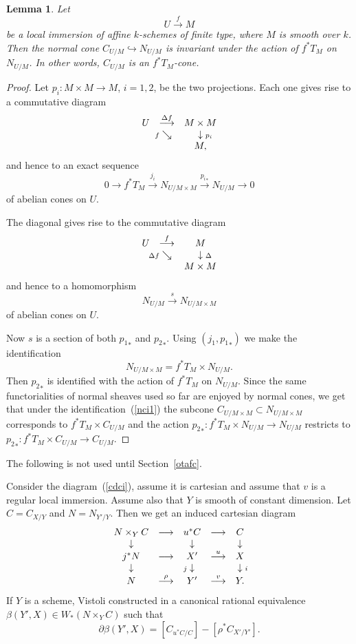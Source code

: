 \documentclass[11pt]{article}
\theoremstyle{plain}
\newtheorem{lem}[prop]{Lemma}
\theoremstyle{definition}
\newenvironment{pf}{\begin{proof}}{\end{proof}}
\newcommand{\upst}{^{\ast}}
\newcommand{\lst}{_{\ast}}
\newcommand{\del}{\partial}
\newcommand{\ldiag}[1]
       {\makebox[0cm]{\({\scriptstyle#1}\downarrow\phantom{\scriptstyle#1}\)}}
\newcommand{\rdiag}[1]
       {\makebox[0cm]{\(\phantom{\scriptstyle#1}\downarrow{\scriptstyle#1}\)}}
\newcommand{\sediag}[1]
       {\makebox[0cm]{\({\scriptstyle#1}\searrow\phantom{\scriptstyle#1}\)}}
\newcommand{\comtri}[6]{
\begin{array}{ccc}
#1 & \stackrel{#2}{\longrightarrow} & #3         \\
   & \sediag{#4}                    & \rdiag{#5} \\
   &                                & #6
\end{array}}
\newcommand{\ses}[5]
{0\longrightarrow#1\stackrel{#2}{ \longrightarrow}#3\stackrel{#4}{
\longrightarrow}#5\longrightarrow0}
\theoremstyle{plain}
\theoremstyle{definition}
\theoremstyle{remark}
\begin{document}
\begin{lem}\label{nci} %
Let
\[
U \stackrel{f}{\longrightarrow}  M
\]
be a local immersion of affine
\(k\)-schemes of finite type, where \(M\) is smooth over \(k\). Then the normal cone
\(C_{U/M}\hookrightarrow N_{U/M}\) is invariant under the action of \(f\upst T_M\)
on
\(N_{U/M}\). In other words, \(C_{U/M}\) is an \(f\upst T_M\)-cone.
\end{lem}
\begin{pf}
Let \(p_i:M\times M\rightarrow M\), \(i=1,2\), be the two projections.
Each one gives rise to a commutative diagram
\[
\comtri{U}{\Delta f}{M\times M}{f}{p_i}{M,}
\]
and hence to an exact sequence
\[
\ses{f\upst T_M}{j_i}{N_{U/M\times M}}{{p_i}\lst}{N_{U/M}}
\]
of abelian cones on \(U\).

The diagonal gives rise to the commutative diagram
\[
\comtri{U}{f}{M}{\Delta f}{\Delta}{M\times M}
\]
and hence to a homomorphism
\[
N_{U/M}\stackrel{s}{\longrightarrow} N_{U/M\times M}
\]
of abelian cones on \(U\).

Now \(s\) is a section of both \({p_1}\lst\) and \({p_2}\lst\). Using
\((j_1,{p_1}\lst)\) we make the identification
\begin{equation} \label{nci1}
N_{U/M \times M}=f\upst T_M\times N_{U/M}.
\end{equation}
Then \({p_2}\lst\) is identified with the action of \(f\upst T_M\) on
\(N_{U/M}\). Since the same functorialities of normal sheaves used so
far are enjoyed by normal cones, we get that under the
identification~(\ref{nci1}) the subcone \(C_{U/M\times M}\subset
N_{U/M\times M}\) corresponds to \(f\upst T_M\times C_{U/M}\) and the
action \({p_2}\lst:f\upst T_M\times N_{U/M}\rightarrow N_{U/M}\)
restricts to \({p_2}\lst:f\upst T_M\times C_{U/M}\rightarrow C_{U/M}\).
\end{pf}

The following is not used until Section~\ref{otafc}.

Consider the diagram~(\ref{cdci}), assume it is cartesian and assume
that \(v\) is a regular local immersion. Assume also that \(Y\) is smooth
of constant dimension.  Let \(C=C_{X/Y}\) and \(N=N_{Y'/Y}\). Then we get
an induced cartesian diagram
\begin{equation} \label{bdnc}
\begin{array}{ccccc}
N\times_YC & \longrightarrow & u\upst C & \longrightarrow & C \\
\ldiag{} & & \ldiag{} & & \rdiag{} \\
j\upst N & \longrightarrow & X' & \stackrel{u}{\longrightarrow} & X \\
\ldiag{} & & \ldiag{j} & & \rdiag{i} \\
N & \stackrel{\rho}{\longrightarrow} & Y' &
\stackrel{v}{\longrightarrow} & Y.
\end{array}
\end{equation}
If \(Y\) is a scheme, Vistoli constructed in \cite{vistoli} a canonical
rational equivalence \(\beta(Y',X)\in W\lst(N\times_YC)\) such that
\[
\del\beta(Y',X)=[C_{u\upst C/C}]-[\rho\upst C_{X'/Y'}].
\]
\end{document}
